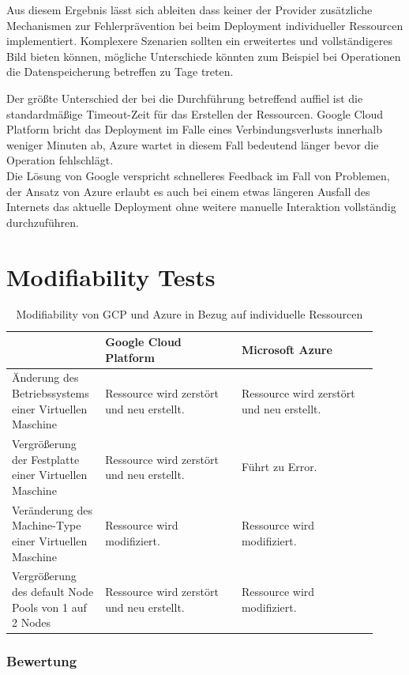 \begin{spacing}{1.2}
Aus diesem Ergebnis lässt sich ableiten dass keiner der Provider
zusätzliche Mechanismen zur Fehlerprävention bei beim Deployment
individueller Ressourcen implementiert. Komplexere Szenarien sollten
ein erweitertes und vollständigeres Bild bieten können, mögliche
Unterschiede könnten zum Beispiel bei Operationen die Datenspeicherung
betreffen zu Tage treten.

Der größte Unterschied der bei die Durchführung betreffend auffiel ist
die standardmäßige Timeout-Zeit für das Erstellen der Ressourcen.
Google Cloud Platform bricht das Deployment im Falle eines
Verbindungsverlusts innerhalb weniger Minuten ab, Azure wartet
in diesem Fall bedeutend länger bevor die Operation fehlschlägt.\\
Die Lösung von Google verspricht schnelleres Feedback im Fall von
Problemen, der Ansatz von Azure erlaubt es auch bei einem etwas
längeren Ausfall des Internets das aktuelle Deployment ohne weitere
manuelle Interaktion vollständig durchzuführen.

\section{Modifiability Tests}

\begin{table}[H]
  \centering
  \begin{tabular}{|p{0.22\linewidth}|p{0.35\linewidth}|p{0.35\linewidth}|}
    \hline
    & Google Cloud Platform & Microsoft Azure\\
    \hline
    Änderung des Betriebssystems einer Virtuellen Maschine &
    Ressource wird zerstört und neu erstellt. &
    Ressource wird zerstört und neu erstellt.\\
    \hline
    Vergrößerung der Festplatte einer Virtuellen Maschine &
    Ressource wird zerstört und neu erstellt.&
    Führt zu Error.\\
    \hline
    Veränderung des Machine-Type einer Virtuellen Maschine &
    Ressource wird modifiziert. &
    Ressource wird modifiziert.\\
    \hline
    Vergrößerung des default Node Pools von 1 auf 2 Nodes &
    Ressource wird zerstört und neu erstellt. &
    Ressource wird modifiziert. \\
    \hline
  \end{tabular}
  \caption{Modifiability von GCP und Azure in Bezug auf individuelle Ressourcen}
\end{table}

\subsubsection{Bewertung}


\end{spacing}
